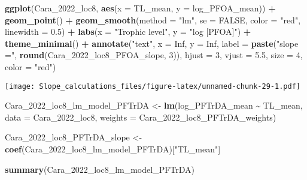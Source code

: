 \documentclass[
]{article}
\newenvironment{Shaded}{\begin{snugshade}}{\end{snugshade}}
\newcommand{\AttributeTok}[1]{\textcolor[rgb]{0.13,0.29,0.53}{#1}}
\newcommand{\ConstantTok}[1]{\textcolor[rgb]{0.56,0.35,0.01}{#1}}
\newcommand{\DecValTok}[1]{\textcolor[rgb]{0.00,0.00,0.81}{#1}}
\newcommand{\FloatTok}[1]{\textcolor[rgb]{0.00,0.00,0.81}{#1}}
\newcommand{\FunctionTok}[1]{\textcolor[rgb]{0.13,0.29,0.53}{\textbf{#1}}}
\newcommand{\NormalTok}[1]{#1}
\newcommand{\OtherTok}[1]{\textcolor[rgb]{0.56,0.35,0.01}{#1}}
\newcommand{\SpecialCharTok}[1]{\textcolor[rgb]{0.81,0.36,0.00}{\textbf{#1}}}
\newcommand{\StringTok}[1]{\textcolor[rgb]{0.31,0.60,0.02}{#1}}
\begin{document}
\begin{Shaded}
\begin{Highlighting}[]
\FunctionTok{ggplot}\NormalTok{(Cara\_2022\_loc8, }\FunctionTok{aes}\NormalTok{(}\AttributeTok{x =}\NormalTok{ TL\_mean, }\AttributeTok{y =}\NormalTok{ log\_PFOA\_mean)) }\SpecialCharTok{+}
  \FunctionTok{geom\_point}\NormalTok{() }\SpecialCharTok{+}
  \FunctionTok{geom\_smooth}\NormalTok{(}\AttributeTok{method =} \StringTok{"lm"}\NormalTok{, }\AttributeTok{se =} \ConstantTok{FALSE}\NormalTok{, }\AttributeTok{color =} \StringTok{"red"}\NormalTok{, }\AttributeTok{linewidth =} \FloatTok{0.5}\NormalTok{) }\SpecialCharTok{+}
  \FunctionTok{labs}\NormalTok{(}\AttributeTok{x =} \StringTok{"Trophic level"}\NormalTok{,}
       \AttributeTok{y =} \StringTok{"log [PFOA]"}\NormalTok{) }\SpecialCharTok{+}
  \FunctionTok{theme\_minimal}\NormalTok{() }\SpecialCharTok{+}
  \FunctionTok{annotate}\NormalTok{(}\StringTok{"text"}\NormalTok{, }\AttributeTok{x =} \ConstantTok{Inf}\NormalTok{, }\AttributeTok{y =} \ConstantTok{Inf}\NormalTok{, }\AttributeTok{label =} \FunctionTok{paste}\NormalTok{(}\StringTok{"slope ="}\NormalTok{, }\FunctionTok{round}\NormalTok{(Cara\_2022\_loc8\_PFOA\_slope, }\DecValTok{3}\NormalTok{)), }
           \AttributeTok{hjust =} \DecValTok{3}\NormalTok{, }\AttributeTok{vjust =} \FloatTok{5.5}\NormalTok{, }\AttributeTok{size =} \DecValTok{4}\NormalTok{, }\AttributeTok{color =} \StringTok{"red"}\NormalTok{)}
\end{Highlighting}
\end{Shaded}

\texttt{[image: Slope\_calculations\_files/figure-latex/unnamed-chunk-29-1.pdf]}

\begin{Shaded}
\begin{Highlighting}[]
\NormalTok{Cara\_2022\_loc8\_lm\_model\_PFTrDA }\OtherTok{\textless{}{-}} \FunctionTok{lm}\NormalTok{(log\_PFTrDA\_mean }\SpecialCharTok{\textasciitilde{}}\NormalTok{ TL\_mean, }
                                     \AttributeTok{data =}\NormalTok{ Cara\_2022\_loc8, }
                                     \AttributeTok{weights =}\NormalTok{ Cara\_2022\_loc8\_PFTrDA\_weights)}

\NormalTok{Cara\_2022\_loc8\_PFTrDA\_slope }\OtherTok{\textless{}{-}} \FunctionTok{coef}\NormalTok{(Cara\_2022\_loc8\_lm\_model\_PFTrDA)[}\StringTok{"TL\_mean"}\NormalTok{]}

\FunctionTok{summary}\NormalTok{(Cara\_2022\_loc8\_lm\_model\_PFTrDA)}
\end{Highlighting}
\end{Shaded}
\end{document}
